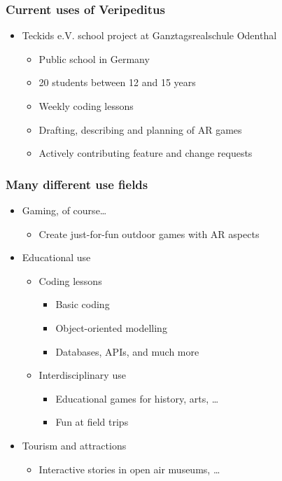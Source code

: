 \documentclass[aspectratio=43]{beamer}
\begin{document}
 \begin{frame}
  \frametitle{Current uses of Veripeditus}

  \begin{itemize}
   \item{Teckids e.V. school project at Ganztagsrealschule Odenthal
    \begin{itemize}
     \item{Public school in Germany}
     \item{20 students between 12 and 15 years}
     \item{Weekly coding lessons}
     \item{Drafting, describing and planning of AR games}
     \item{Actively contributing feature and change requests}
    \end{itemize}
   }
  \end{itemize}
 \end{frame}


 \begin{frame}
  \frametitle{Many different use fields}

  \begin{itemize}
   \item{Gaming, of course…
    \begin{itemize}
     \item{Create just-for-fun outdoor games with AR aspects}
    \end{itemize}
   }
   \item{Educational use
    \begin{itemize}
     \item{Coding lessons
      \begin{itemize}
       \item{Basic coding}
       \item{Object-oriented modelling}
       \item{Databases, APIs, and much more}
      \end{itemize}
     }
     \item{Interdisciplinary use
      \begin{itemize}
       \item{Educational games for history, arts, …}
       \item{Fun at field trips}
      \end{itemize}
     }
    \end{itemize}
   }
   \item{Tourism and attractions
    \begin{itemize}
     \item{Interactive stories in open air museums, …}
    \end{itemize}
   }
  \end{itemize}
 \end{frame}
\end{document}
